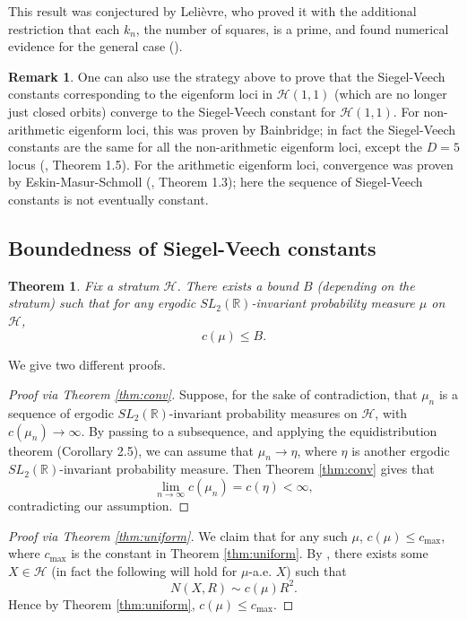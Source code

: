 \documentclass{article}
\newtheorem{thm}{Theorem}[section]
\theoremstyle{definition}
\newtheorem{rmk}{Remark}[section]
\begin{document}
This result was conjectured by Leli{\`e}vre, who proved it with the additional restriction that each $k_n$, the number of squares, is a prime, and found numerical evidence for the general case  (\cite{lelievre2006}).

\begin{rmk}
  One can also use the strategy above to prove that the Siegel-Veech constants corresponding to the eigenform loci in $\mathcal{H}(1,1)$ (which are no longer just closed orbits) converge to the Siegel-Veech constant for $\mathcal{H}(1,1)$.  For non-arithmetic eigenform loci, this was proven by Bainbridge; in fact the Siegel-Veech constants are the same for all the non-arithmetic eigenform loci, except the $D=5$ locus (\cite{bainbridge2010}, Theorem 1.5).  For the arithmetic eigenform loci, convergence was proven by Eskin-Masur-Schmoll (\cite{ems2003}, Theorem 1.3); here the sequence of Siegel-Veech constants is not eventually constant.   
\end{rmk}

\subsection{Boundedness of Siegel-Veech constants}
\label{sec:bound-sv}

\begin{thm} \label{thm:upperbound}
  Fix a stratum $\mathcal{H}$.  There exists a bound $B$ (depending on the stratum) such that for any ergodic $SL_2(\mathbb{R})$-invariant probability measure $\mu$ on $\mathcal{H}$,
$$c(\mu) \le B.$$
\end{thm}

We give two different proofs. 

\begin{proof}[Proof via Theorem \ref{thm:conv}]
  Suppose, for the sake of contradiction, that $\mu_n$ is a sequence of ergodic $SL_2(\mathbb{R})$-invariant probability measures on $\mathcal{H}$, with $c(\mu_n) \to \infty$.  By passing to a subsequence, and applying the equidistribution theorem \cite{emm2015} (Corollary 2.5), we can assume that $\mu_n \to \eta$, where $\eta$ is another ergodic $SL_2(\mathbb{R})$-invariant probability measure.  Then Theorem \ref{thm:conv} gives that 
$$\lim_{n\to\infty} c(\mu_n) = c(\eta) < \infty,$$
contradicting our assumption.  
\end{proof}

\begin{proof}[Proof via Theorem \ref{thm:uniform}]
  We claim that for any such $\mu$, $c(\mu) \le c_{\max}$, where $c_{\max}$ is the constant in Theorem \ref{thm:uniform}.  By \cite{em2001}, there exists some $X\in \mathcal{H}$ (in fact the following will hold for $\mu$-a.e. $X$) such that 
$$N(X,R) \sim c(\mu) R^2.$$
Hence by Theorem \ref{thm:uniform}, $c(\mu) \le c_{\max}$.  
\end{proof}
\end{document}
